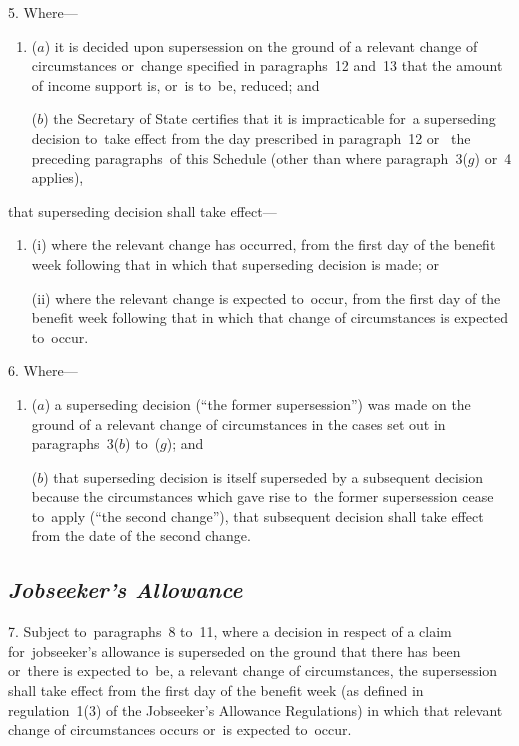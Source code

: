 \documentclass[12pt,a4paper]{article}
\begin{document}
5.  Where—
\begin{enumerate}\item[]
($a$) it is decided upon supersession on the ground of a relevant change of circumstances 
or~change specified in paragraphs~12 and~13  %
that the amount of income support is, or~is to~be, reduced; and

($b$) the Secretary of State certifies that it is impracticable for~a superseding decision to~take effect from the day prescribed in 
paragraph~12 or~ %
the preceding paragraphs~of this Schedule (other than where paragraph~3($g$)  or~4 applies),
\end{enumerate}
that superseding decision shall take effect—
\begin{enumerate}\item[]
(i) where the relevant change has occurred, from the first day of the benefit week following that in which that superseding decision is made; or

(ii) where the relevant change is expected to~occur, from the first day of the benefit week following that in which that change of circumstances is expected to~occur.
\end{enumerate}


\medskip

6.  Where—
\begin{enumerate}\item[]
($a$) a superseding decision (“the former supersession”) was made on the ground of a relevant change of circumstances in the cases set out in paragraphs~3($b$)  to~($g$); and

($b$) that superseding decision is itself superseded by a subsequent decision because the circumstances which gave rise to~the former supersession cease to~apply (“the second change”), that subsequent decision shall take effect from the date of the second change.
\end{enumerate}

\subsection*{\itshape Jobseeker’s Allowance}

7.  Subject to~paragraphs~8 to~11, where a decision in respect of a claim for~jobseeker’s allowance is superseded on the ground that there has been or~there is expected to~be, a relevant change of circumstances, the supersession shall take effect from the first day of the benefit week (as defined in regulation~1(3) of the Jobseeker’s Allowance Regulations) in which that relevant change of circumstances occurs or~is expected to~occur.
\end{document}
